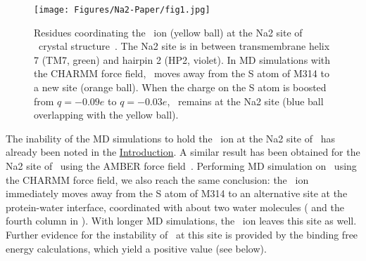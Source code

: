 \begin{figure}[t!]
\centering
\texttt{[image: Figures/Na2-Paper/fig1.jpg]}
\caption{Residues coordinating the \Na\ ion (yellow ball) at the Na2 site of \GltTk\ crystal
structure~\cite{Guskov2016}. The Na2 site is in between transmembrane helix 7 (TM7, green) and
hairpin 2 (HP2, violet). In MD simulations with the CHARMM force field, \Na\ moves away from 
the S atom of M314 to a new site (orange ball). When the charge on the S atom is boosted from
$q=-0.09e$ to $q=-0.03e$, \Na\ remains at the Na2 site (blue ball overlapping with the yellow
ball).}
\label{na2:fig1}
\end{figure}

The inability of the MD simulations to hold the \Na\ ion at the Na2 site of \GltPh\ has already been 
noted in the \hyperref[na2:intro]{Introduction}. A similar result has been obtained for the Na2 site 
of \GltTk\ using the AMBER force field~\cite{Guskov2016}. Performing MD simulation on \GltTk\ using 
the CHARMM force field, we also reach the same conclusion: the \Na\ ion immediately moves away from 
the S atom of M314 to an alternative site at the protein-water interface, coordinated with about two 
water molecules ( and the fourth column in ). With longer MD 
simulations, the \Na\ ion leaves this site as well. Further evidence for the instability of \Na\ at 
this site is provided by the binding free energy calculations, which yield a positive value (see below).

